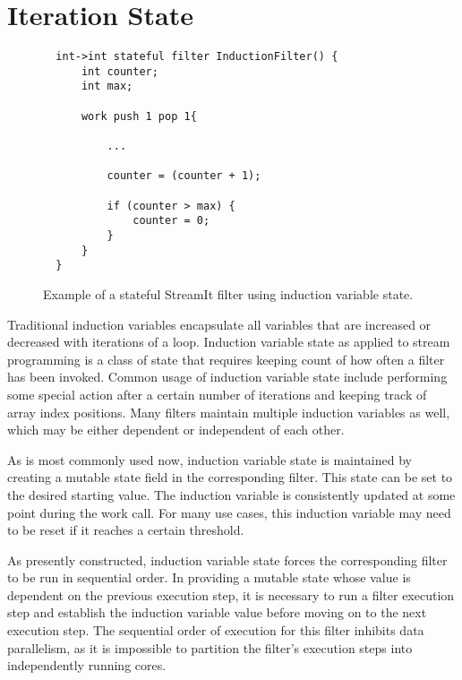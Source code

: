 \section{Iteration State}

\begin{figure}[t]
{\eightpoint
\begin{verbatim}
  int->int stateful filter InductionFilter() {
      int counter;
      int max;
  
      work push 1 pop 1{

          ...

          counter = (counter + 1);

          if (counter > max) {
              counter = 0;
          } 
      }
  }
\end{verbatim}
\caption{Example of a stateful StreamIt filter using induction variable state.\protect\label{fig:filter-example}}}
\end{figure}


Traditional induction variables encapsulate all variables that are
increased or decreased with iterations of a loop.  Induction variable
state as applied to stream programming is a class of state that
requires keeping count of how often a filter has been invoked.  Common
usage of induction variable state include performing some special
action after a certain number of iterations and keeping track of array
index positions.  Many filters maintain multiple induction variables
as well, which may be either dependent or independent of each other.

As is most commonly used now, induction variable state is maintained
by creating a mutable state field in the corresponding filter.  This
state can be set to the desired starting value.  The induction
variable is consistently updated at some point during the work call.
For many use cases, this induction variable may need to be reset if it
reaches a certain threshold. 

As presently constructed, induction variable state forces the
corresponding filter to be run in sequential order.  In providing a
mutable state whose value is dependent on the previous execution step,
it is necessary to run a filter execution step and establish the
induction variable value before moving on to the next execution step.
The sequential order of execution for this filter inhibits data
parallelism, as it is impossible to partition the filter's execution
steps into independently running cores.


